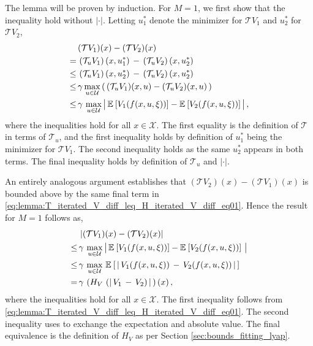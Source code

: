 \documentclass[journal]{IEEEtran}
\newcommand{\bcol}[1]{{\color{black}#1}}
\newcommand{\kcol}[1]{{\color{black}#1}}
\newcommand{\mcal}{\mathcal}
\newcommand{\expval}[2]{\mathbb{E}_{#1}\left[#2\right]}
\begin{document}
\begin{IEEEproof}
	The lemma will be proven by induction. For $M=1$, we first show that the inequality hold without $|\cdot|$. Letting $u_1^\ast$ denote the minimizer for $\mcal{T}V_1$ and $u_2^\ast$ for $\mcal{T}V_2$,
\begin{equation} \label{eq:lemma:T_iterated_V_diff_leq_H_iterated_V_diff_eq01}
		\begin{aligned}
			&\, (\mcal{T} V_1)(x) - (\mcal{T} V_2)(x)
			\\
			=&\, \left( \mcal{T}_u V_1 \right)(x,\bcol{u_1^\ast})
				\,-\, \left( \mcal{T}_u V_2 \right)(x,\bcol{u_2^\ast})
			\\
			\kcol{\leq}&\, \left( \mcal{T}_u V_1 \right)(x,\bcol{u_2^\ast})
				\,-\, \left( \mcal{T}_u V_2 \right)(x,\bcol{u_2^\ast})
			\\
			\kcol{\leq}&\, \gamma \, \bcol{\max_{u\in\mcal{U}}} \left(\, (\mcal{T}_u V_1)(x,\bcol{u}) - (\mcal{T}_u V_2)(x,\bcol{u}) \,\right)
			\\
			\kcol{\leq}&\, \gamma \, \max_{u\in\mcal{U}} \bcol{\big|\, \kcol{ \expval{}{V_1(f(x,u,\xi))} - \expval{}{V_2(f(x,u,\xi))} } \,\big|}
				\,,
		\end{aligned}
	\end{equation}
where the inequalities hold for all $x \in \mcal{X}$. The first equality is the definition of $\mcal{T}$ in terms of $\mcal{T}_u$, and the first inequality holds by definition of $u_1^\ast$ being the minimizer for $\mcal{T}V_1$. The second inequality holds as the same $u_2^\ast$ appears in both terms. The final inequality holds by definition of $\mcal{T}_u$ and $|\cdot|$.
	
	
	An entirely analogous argument establishes that $(\mcal{T} V_2)(x) - (\mcal{T} V_1)(x)$ is bounded above by the same final term in \eqref{eq:lemma:T_iterated_V_diff_leq_H_iterated_V_diff_eq01}. Hence the result for $M=1$ follows as,
	\begin{equation} \label{eq:lemma:T_iterated_V_diff_leq_H_iterated_V_diff_eq02}
		\begin{aligned}
			&\, \left| (\mcal{T} V_1)(x) - (\mcal{T} V_2)(x) \right|
			\\
			\kcol{\leq}&\, \gamma \, \max_{u\in\mcal{U}} \big|\, \expval{}{V_1(f(x,u,\xi))} - \expval{}{V_2(f(x,u,\xi))} \,\big|
			\\
			\kcol{\leq}&\, \gamma \, \max_{u\in\mcal{U}} \, \bcol{\expval{}{\, \kcol{ \left| \, V_1(f(x,u,\xi)) \,-\, V_2(f(x,u,\xi)) \, \right| } \,} }
			\\
			=&\, \gamma \, \left( H_V \, \left( \left| \, V_1 \,-\, V_2 \right) \, \right| \, \right)(x)
				\,,
		\end{aligned}
	\end{equation}
	where the inequalities hold for all $x \in \mcal{X}$. The first inequality follows from \eqref{eq:lemma:T_iterated_V_diff_leq_H_iterated_V_diff_eq01}. The second inequality uses \cite[Lemma 1.7.2]{christensen_2010_functions} to exchange the expectation and absolute value. The final equivalence is the definition of $H_V$ as per Section \ref{sec:bounds_fitting_lyap}.


\end{IEEEproof}
\end{document}
